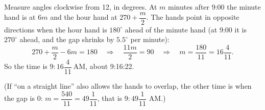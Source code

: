 Measure angles clockwise from 12, in degrees. At $m$ minutes after 9:00 the minute hand is at $6m$ and the hour hand at $270+\dfrac{m}{2}$. The hands point in opposite directions when the hour hand is $180^\circ$ ahead of the minute hand (at 9:00 it is $270^\circ$ ahead, and the gap shrinks by $5.5^\circ$ per minute):
\[
270+\dfrac{m}{2}-6m=180\quad\Longrightarrow\quad \dfrac{11m}{2}=90\quad\Longrightarrow\quad m=\dfrac{180}{11}=16\dfrac{4}{11}.
\]
So the time is $\boxed{9{:}16\dfrac{4}{11}\ \text{AM}}$, about 9:16:22.

(If ``on a straight line'' also allows the hands to overlap, the other time is when the gap is $0$: $m=\dfrac{540}{11}=49\dfrac{1}{11}$, that is $9{:}49\dfrac{1}{11}$ AM.)
